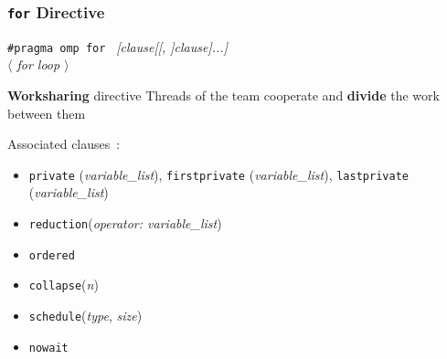 \documentclass{beamer}
\begin{document}

\begin{frame}
  \frametitle{\texttt{for} Directive}
  
\begin{framed}
  {\tt \#pragma omp for } {\it  [clause[[, ]clause]...]}  \\
  {\it $\langle$ for loop $\rangle$} 
\end{framed}

\begin{alertblock}{\textbf{Worksharing} directive}
  Threads of the team cooperate and \textbf{divide} the work between them
\end{alertblock}

\medskip
  
Associated clauses~:
  \begin{itemize}
  \item {\tt private} ({\it variable\_list}), {\tt firstprivate} ({\it variable\_list}), {\tt lastprivate} ({\it variable\_list})
  \item {\tt reduction}({\it operator: variable\_list})
  \item {\tt ordered}
  \item {\tt collapse}({\it n})
  \item {\tt  schedule}({\it type}, {\it size})
  \item {\tt nowait}
  \end{itemize}
  
\end{frame}
\end{document}
